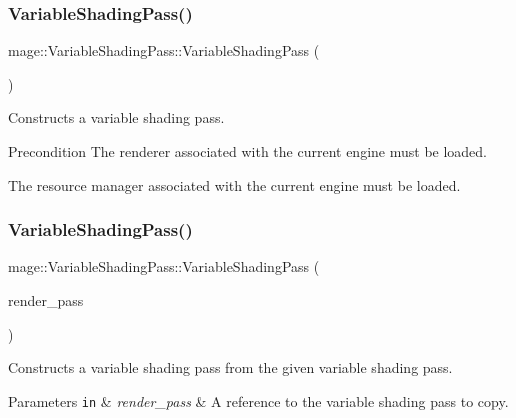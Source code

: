 \subsubsection{\texorpdfstring{Variable\+Shading\+Pass()}{VariableShadingPass()}\hspace{0.1cm}{\footnotesize\ttfamily [1/3]}}
{\footnotesize\ttfamily mage\+::\+Variable\+Shading\+Pass\+::\+Variable\+Shading\+Pass (\begin{DoxyParamCaption}{ }\end{DoxyParamCaption})}

Constructs a variable shading pass.

\begin{DoxyPrecond}{Precondition}
The renderer associated with the current engine must be loaded. 

The resource manager associated with the current engine must be loaded. 
\end{DoxyPrecond}
\hypertarget{classmage_1_1_variable_shading_pass_a98ce8bacba3894ff29d2a13d3a645d22}{}\label{classmage_1_1_variable_shading_pass_a98ce8bacba3894ff29d2a13d3a645d22} 
\subsubsection{\texorpdfstring{Variable\+Shading\+Pass()}{VariableShadingPass()}\hspace{0.1cm}{\footnotesize\ttfamily [2/3]}}
{\footnotesize\ttfamily mage\+::\+Variable\+Shading\+Pass\+::\+Variable\+Shading\+Pass (\begin{DoxyParamCaption}\item[{const \hyperlink{classmage_1_1_variable_shading_pass}{Variable\+Shading\+Pass} \&}]{render\+\_\+pass }\end{DoxyParamCaption})\hspace{0.3cm}{\ttfamily [delete]}}

Constructs a variable shading pass from the given variable shading pass.


\begin{DoxyParams}[1]{Parameters}
\mbox{\tt in}  & {\em render\+\_\+pass} & A reference to the variable shading pass to copy. \\
\hline
\end{DoxyParams}
\hypertarget{classmage_1_1_variable_shading_pass_afcb297b4d400a6eb119846d4c04fc3d1}{}\label{classmage_1_1_variable_shading_pass_afcb297b4d400a6eb119846d4c04fc3d1} 
